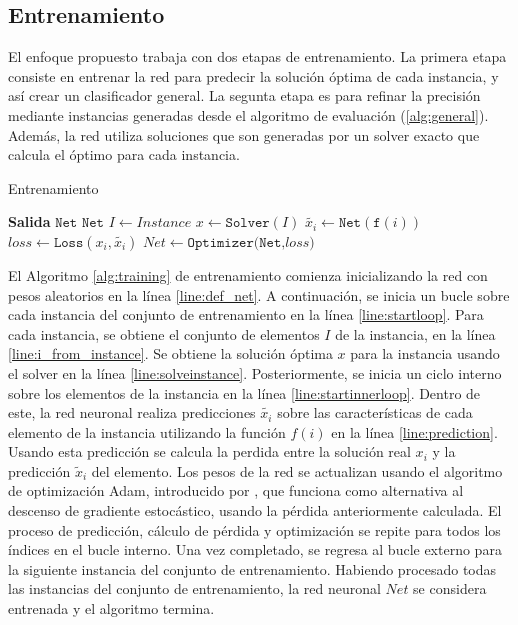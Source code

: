 \documentclass[spanish, a4paper, 12pt, openany,final]{book}
\begin{document}
\subsection{Entrenamiento}

El enfoque propuesto trabaja con dos etapas de entrenamiento. La primera etapa consiste en entrenar la red para predecir la solución óptima de cada instancia, y así crear un clasificador general. La segunta etapa es para refinar la precisión mediante instancias generadas desde el algoritmo de evaluación (\ref{alg:general}). Además, la red utiliza soluciones que son generadas por un solver exacto que calcula el óptimo para cada instancia. 

\begin{algorithm}[H]
	\caption{Entrenamiento}\label{alg:training}
	\begin{algorithmic}[1]
		\Statex \textbf{Salida} $\texttt{Net}$
		\label{line:loss}
		\State $\texttt{Net}$ \label{line:def_net}
		   \label{line:startloop}
		\State $I \gets Instance$ \label{line:i_from_instance}
		\State $x \gets \texttt{Solver}(I)$\label{line:solveinstance}
		 \label{line:startinnerloop}
		\State $\tilde{x_i} \gets \texttt{Net}(\texttt{f}(i))$   \label{line:prediction}
		\State $loss \gets \texttt{Loss}(x_i,\tilde{x_i})$ \label{line:calculateloss}
		\State $Net \gets \texttt{Optimizer(Net,$loss$)}$ \label{line:optimizationstep}
		\EndFor \label{line:endinnerloop}
		\EndFor \label{line:endloop}
	\end{algorithmic}
\end{algorithm}

El Algoritmo \ref{alg:training} de entrenamiento comienza inicializando la red con pesos aleatorios en la línea \ref{line:def_net}. A continuación, se inicia un bucle sobre cada instancia del conjunto de entrenamiento en la línea \ref{line:startloop}. Para cada instancia, se obtiene el conjunto de elementos $I$ de la instancia, en la línea \ref{line:i_from_instance}. Se obtiene la solución óptima $x$ para la instancia usando el solver en la línea \ref{line:solveinstance}. Posteriormente, se inicia un ciclo interno sobre los elementos de la instancia en la línea \ref{line:startinnerloop}. Dentro de este, la red neuronal realiza predicciones $\tilde{x_i}$ sobre las características de cada elemento de la instancia utilizando la función \(f(i)\) en la línea \ref{line:prediction}.
Usando esta predicción se calcula la perdida entre la solución real $x_i$ y la predicción $\tilde{x}_i$ del elemento. Los pesos de la red se actualizan usando el algoritmo de optimización Adam, introducido por \cite{kingma2017adam}, que funciona como alternativa al descenso de gradiente estocástico, usando la pérdida anteriormente calculada. El proceso de predicción, cálculo de pérdida y optimización se repite para todos los índices en el bucle interno. Una vez completado, se regresa al bucle externo para la siguiente instancia del conjunto de entrenamiento. Habiendo procesado todas las instancias del conjunto de entrenamiento, la red neuronal $Net$ se considera entrenada y el algoritmo termina.
\end{document}

